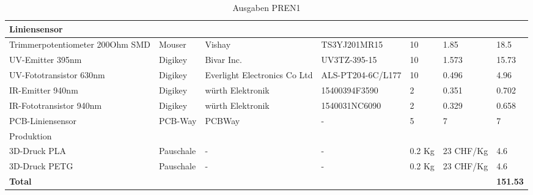 \documentclass[main.tex]{subfiles} %
\begin{document}
\begin{table}[h]
{\begin{tabular}{|p{3cm}|p{2.5cm}|p{2.5cm}|p{3cm}|p{1cm}|p{1.5cm}|p{1cm}|}
            \rowcolor{lightgray} Liniensensor       &                    &                              &                         &                 &                           &                             \\ \hline
            Trimmerpotentiometer 200Ohm SMD         & Mouser             & Vishay                       & TS3YJ201MR15            & 10              & 1.85                      & 18.5                        \\ \hline
            UV-Emitter 395nm                        & Digikey            & Bivar Inc.                   & UV3TZ-395-15            & 10              & 1.573                     & 15.73                       \\ \hline
            UV-Fototransistor 630nm                 & Digikey            & Everlight Electronics Co Ltd & ALS-PT204-6C/L177       & 10              & 0.496                     & 4.96                        \\ \hline
            IR-Emitter 940nm                        & Digikey            & würth Elektronik             & 15400394F3590           & 2               & 0.351                     & 0.702                       \\ \hline
            IR-Fototransistor 940nm                 & Digikey            & würth Elektronik             & 1540031NC6090           & 2               & 0.329                     & 0.658                       \\ \hline
            PCB-Liniensensor                        & PCB-Way            & PCBWay                       & -                       & 5               & 7                         & 7                           \\ \hline
            \rowcolor{lightgray} Produktion         &                    &                              &                         &                 &                           &                             \\ \hline
            3D-Druck PLA                            & Pauschale          & -                            & -                       & 0.2 Kg          & 23 CHF/Kg                 & 4.6                         \\ \hline
            3D-Druck PETG                           & Pauschale          & -                            & -                       & 0.2 Kg          & 23 CHF/Kg                 & 4.6                         \\ \hline

            \textbf{Total}                          &                    &                              &                         &                 &                           & \textbf{151.53}                \\ \hline
        \end{tabular}
    }
    \caption{Ausgaben PREN1}
    \label{tab:Ausgaben_PREN1}
\end{table}
\end{document}
